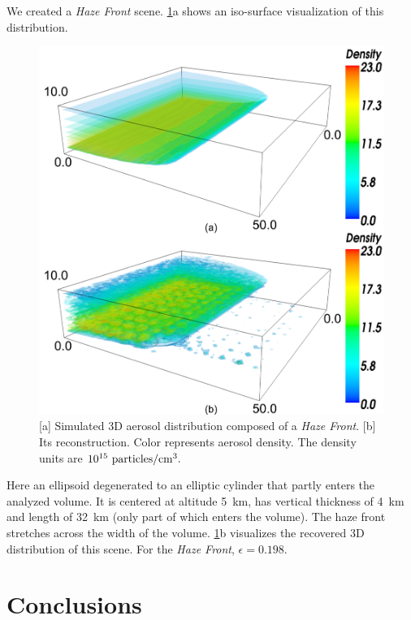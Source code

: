 \documentclass[10pt,letterpaper]{article}
\newcommand{\yoavcomment}[1]{}
\renewcommand{\yoavcomment}[1]{#1} %
\begin{document}
We created a {\em Haze Front} scene. \cref{fig:simulation2}a shows an
iso-surface visualization of this distribution.
\begin{figure}
  \centering
  \yoavcomment{\includegraphics[width=\columnwidth]{images/simulation2}}
  \caption{\small [a] Simulated 3D aerosol distribution composed of a
    {\em Haze Front}. [b] Its reconstruction. Color represents aerosol
    density. The density units are $10^{15}~{\rm particles}/{\rm
      cm}^3.$}
  \label{fig:simulation2}
\end{figure}
Here an ellipsoid degenerated to an elliptic cylinder that partly
enters the analyzed volume. It is centered at altitude \SI{5}{\km},
has vertical thickness of \SI{4}{\km} and length of \SI{32}{\km} (only
part of which enters the volume). The haze front stretches across the
width of the volume.  \cref{fig:simulation2}b visualizes the recovered
3D distribution of this scene. For the {\em Haze Front},
$\epsilon=0.198$.


\section{Conclusions}
\label{sec:conclusions}
\end{document}
